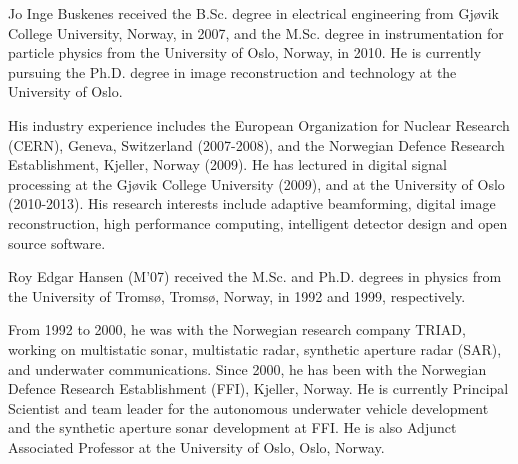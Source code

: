 \documentclass[10pt,journal,draftclsnofoot,onecolumn]{IEEEtran}
\newcommand\1{\vec 1}
\providecommand{\DIFdelbegin}{} %
\providecommand{\DIFdelend}{} %
\begin{document}
\DIFdelbegin %
\DIFdelend %

\begin{IEEEbiography}{Jo Inge Buskenes}
received the B.Sc. degree in electrical engineering from Gj\o{}vik College University, Norway, in 2007, and the M.Sc. degree in instrumentation for particle physics from the University of Oslo, Norway, in 2010. He is currently pursuing the Ph.D. degree in image reconstruction and technology at the University of Oslo.

His industry experience includes the European Organization for Nuclear Research (CERN), Geneva, Switzerland (2007-2008), and the Norwegian Defence Research Establishment, Kjeller, Norway (2009). He has lectured in digital signal processing at the Gj\o{}vik College University (2009), and at the University of Oslo (2010-2013). His research interests include adaptive beamforming, digital image reconstruction, high performance computing, intelligent detector design and open source software.
\end{IEEEbiography}

\begin{IEEEbiography}{Roy Edgar Hansen} (M'07) received the M.Sc. and Ph.D. degrees in physics from the University of Troms\o, Troms\o, Norway, in 1992 and 1999, respectively.

From 1992 to 2000, he was with the Norwegian research company TRIAD, working on multistatic sonar, multistatic radar, synthetic aperture radar (SAR), and underwater communications. Since 2000, he has been with the Norwegian Defence Research Establishment (FFI), Kjeller, Norway. He is currently Principal Scientist and team leader for the autonomous underwater vehicle development and the synthetic aperture sonar development at FFI. He is also Adjunct Associated Professor at the University of Oslo, Oslo, Norway.
\end{IEEEbiography}
\end{document}
